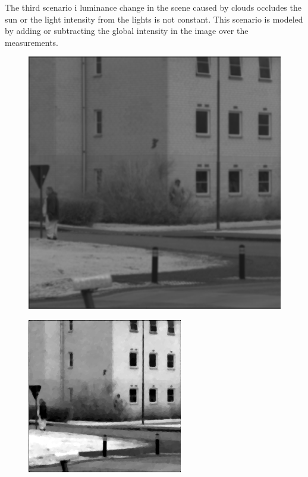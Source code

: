
The third scenario i luminance change in the scene caused by clouds occludes the sun or the light intensity from the lights is not constant. This scenario is modeled by adding or subtracting the global intensity in the image over the measurements. 

\begin{figure}[H]
    \centering
\begin{minipage}[t]{0.245\textwidth}
    \includegraphics[width=1\textwidth]{result/dynamic/lum/intense_change_org.png}
    \label{fig:lum_1}
\end{minipage}
\begin{minipage}[t]{0.245\textwidth}
    \includegraphics[width = \textwidth]{result/dynamic/lum/intense_change.png}

\end{minipage}
\end{figure}

